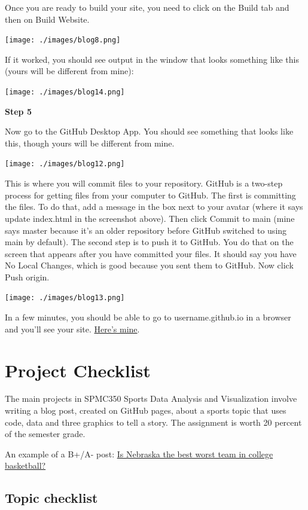 \documentclass[
  letterpaper,
  DIV=11,
  numbers=noendperiod]{scrreprt}
\begin{document}
Once you are ready to build your site, you need to click on the Build
tab and then on Build Website.

\texttt{[image: ./images/blog8.png]}

If it worked, you should see output in the window that looks something
like this (yours will be different from mine):

\texttt{[image: ./images/blog14.png]}

\textbf{Step 5}

Now go to the GitHub Desktop App. You should see something that looks
like this, though yours will be different from mine.

\texttt{[image: ./images/blog12.png]}

This is where you will commit files to your repository. GitHub is a
two-step process for getting files from your computer to GitHub. The
first is committing the files. To do that, add a message in the box next
to your avatar (where it says update index.html in the screenshot
above). Then click Commit to main (mine says master because it's an
older repository before GitHub switched to using main by default). The
second step is to push it to GitHub. You do that on the screen that
appears after you have committed your files. It should say you have No
Local Changes, which is good because you sent them to GitHub. Now click
Push origin.

\texttt{[image: ./images/blog13.png]}

In a few minutes, you should be able to go to username.github.io in a
browser and you'll see your site.
\href{http://mattwaite.github.io/}{Here's mine}.


\hypertarget{project-checklist}{%
\chapter{Project Checklist}\label{project-checklist}}

The main projects in SPMC350 Sports Data Analysis and Visualization
involve writing a blog post, created on GitHub pages, about a sports
topic that uses code, data and three graphics to tell a story. The
assignment is worth 20 percent of the semester grade.

An example of a B+/A- post:
\href{http://mattwaite.github.io/posts/is-nebraska-the-best-worst-basketball-team/}{Is
Nebraska the best worst team in college basketball?}

\hypertarget{topic-checklist}{%
\section{Topic checklist}\label{topic-checklist}}
\end{document}
